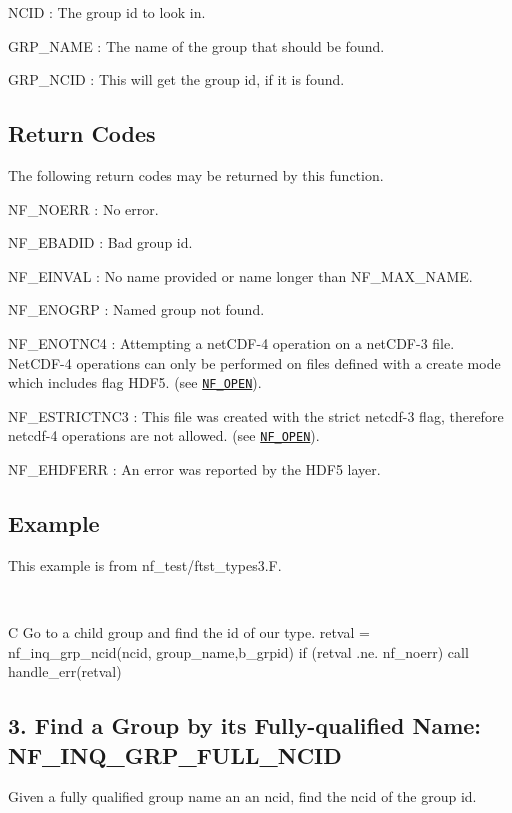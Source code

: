{\ttfamily N\+C\+ID} \+: The group id to look in.

{\ttfamily G\+R\+P\+\_\+\+N\+A\+ME} \+: The name of the group that should be found.

{\ttfamily G\+R\+P\+\_\+\+N\+C\+ID} \+: This will get the group id, if it is found.

\subsection*{Return Codes }

The following return codes may be returned by this function.

{\ttfamily N\+F\+\_\+\+N\+O\+E\+RR} \+: No error.

{\ttfamily N\+F\+\_\+\+E\+B\+A\+D\+ID} \+: Bad group id.

{\ttfamily N\+F\+\_\+\+E\+I\+N\+V\+AL} \+: No name provided or name longer than N\+F\+\_\+\+M\+A\+X\+\_\+\+N\+A\+ME.

{\ttfamily N\+F\+\_\+\+E\+N\+O\+G\+RP} \+: Named group not found.

{\ttfamily N\+F\+\_\+\+E\+N\+O\+T\+N\+C4} \+: Attempting a net\+C\+D\+F-\/4 operation on a net\+C\+D\+F-\/3 file. Net\+C\+D\+F-\/4 operations can only be performed on files defined with a create mode which includes flag H\+D\+F5. (see \href{#NF_005fOPEN}{\tt N\+F\+\_\+\+O\+P\+EN}).

{\ttfamily N\+F\+\_\+\+E\+S\+T\+R\+I\+C\+T\+N\+C3} \+: This file was created with the strict netcdf-\/3 flag, therefore netcdf-\/4 operations are not allowed. (see \href{#NF_005fOPEN}{\tt N\+F\+\_\+\+O\+P\+EN}).

{\ttfamily N\+F\+\_\+\+E\+H\+D\+F\+E\+RR} \+: An error was reported by the H\+D\+F5 layer.

\subsection*{Example }

This example is from nf\+\_\+test/ftst\+\_\+types3.\+F.

 

C Go to a child group and find the id of our type. retval = nf\+\_\+inq\+\_\+grp\+\_\+ncid(ncid, group\+\_\+name,b\+\_\+grpid) if (retval .ne. nf\+\_\+noerr) call handle\+\_\+err(retval)\hypertarget{nc_f77_interface_guide_f77_NF-INQ-GRP-FULL-NCID}{}\subsection{3. Find a Group by its Fully-\/qualified Name\+: N\+F\+\_\+\+I\+N\+Q\+\_\+\+G\+R\+P\+\_\+\+F\+U\+L\+L\+\_\+\+N\+C\+I\+D }\label{nc_f77_interface_guide_f77_NF-INQ-GRP-FULL-NCID}
Given a fully qualified group name an an ncid, find the ncid of the group id.

